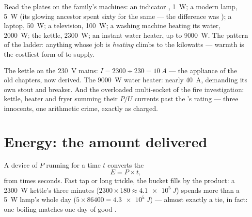 \begin{example}\label{ex:g9:electric-power-energy:ladder}
Read the plates on the family's machines: an indicator ,
\qty{1}{W}; a modern lamp, \qty{5}{W} (its glowing ancestor
spent sixty for the same  --- the difference was );
a laptop, \qty{50}{W}; a television, \qty{100}{W}; a
washing machine heating its water, \qty{2000}{W}; the
kettle, \qty{2300}{W}; an instant water heater, up to
\qty{9000}{W}. The pattern of the ladder: anything whose job
is \emph{heating} climbs to the kilowatts --- warmth is the
costliest form of  to supply.
\end{example}

\begin{example}\label{ex:g9:electric-power-energy:fuses}
The kettle on the \qty{230}{V} mains: $I = 2300 \div 230 =
\qty{10}{A}$ --- the  appliance of the old
chapters, now derived. The \qty{9000}{W} water heater: nearly
\qty{40}{A}, demanding its own stout  and breaker. And
the overloaded multi-socket of the fire investigation:
kettle, heater and fryer summing their $P/U$ currents past
the 's rating --- three innocents, one arithmetic
crime, exactly as charged.
\end{example}

\section{Energy: the amount delivered}

\begin{proposition}\label{prop:g9:electric-power-energy:Pt}
A device of  $P$ running for a time $t$ converts the
\[
E = P \times t ,
\]
 from  times seconds. Fast tap or long trickle,
the bucket fills by the product: a \qty{2300}{W} kettle's
three minutes ($2300 \times 180 \approx \qty{4.1e5}{J}$)
spends more than a \qty{5}{W} lamp's whole day ($5 \times
86400 = \qty{4.3e5}{J}$) --- almost exactly a tie, in fact:
one boiling matches one day of good .
\end{proposition}

